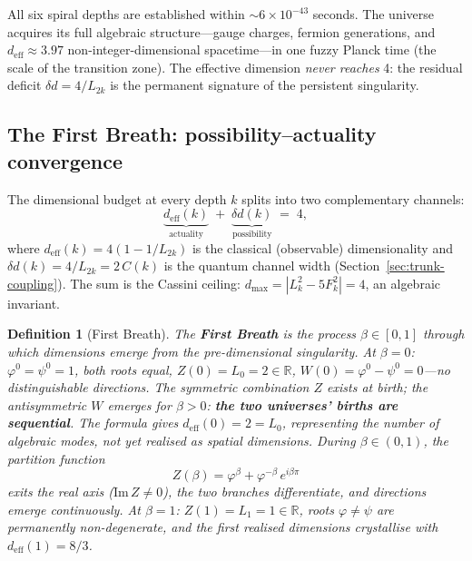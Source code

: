 \documentclass[12pt,a4paper]{article}
\newtheorem{definition}[theorem]{Definition}
\begin{document}
\noindent All six spiral depths are established within $\sim 6 \times 10^{-43}$ seconds. The universe acquires its full algebraic structure---gauge charges, fermion generations, and $d_{\mathrm{eff}} \approx 3.97$ non-integer-dimensional spacetime---in one fuzzy Planck time (the scale of the transition zone).  The effective dimension \emph{never reaches} 4: the residual deficit $\delta d = 4/L_{2k}$ is the permanent signature of the persistent singularity.

\subsection{The First Breath: possibility--actuality convergence}
\label{sec:first-breath}

The dimensional budget at every depth $k$ splits into two complementary channels:
\begin{equation}
\underbrace{d_{\mathrm{eff}}(k)}_{\text{actuality}} \;+\; \underbrace{\delta d(k)}_{\text{possibility}} \;=\; 4,
\label{eq:poss-act-budget}
\end{equation}
where $d_{\mathrm{eff}}(k) = 4(1 - 1/L_{2k})$ is the classical (observable) dimensionality and $\delta d(k) = 4/L_{2k} = 2\,C(k)$ is the quantum channel width (Section~\ref{sec:trunk-coupling}).  The sum is the Cassini ceiling: $d_{\max} = |L_k^2 - 5F_k^2| = 4$, an algebraic invariant.

\begin{definition}[First Breath]
\label{def:first-breath}
The \textbf{First Breath} is the process $\beta \in [0, 1]$ through which dimensions emerge from the pre-dimensional singularity.  At $\beta = 0$: $\varphi^0 = \psi^0 = 1$, both roots equal, $Z(0) = L_0 = 2 \in \mathbb{R}$, $W(0) = \varphi^0 - \psi^0 = 0$---no distinguishable directions.  The symmetric combination $Z$ exists at birth; the antisymmetric $W$ emerges for $\beta > 0$: \textbf{the two universes' births are sequential}.  The formula gives $d_{\mathrm{eff}}(0) = 2 = L_0$, representing the number of algebraic modes, not yet realised as spatial dimensions.  During $\beta \in (0,1)$, the partition function
\begin{equation}
Z(\beta) = \varphi^\beta + \varphi^{-\beta}\,e^{i\beta\pi}
\end{equation}
exits the real axis ($\mathrm{Im}\,Z \neq 0$), the two branches differentiate, and directions emerge continuously.  At $\beta = 1$: $Z(1) = L_1 = 1 \in \mathbb{R}$, roots $\varphi \neq \psi$ are permanently non-degenerate, and the first realised dimensions crystallise with $d_{\mathrm{eff}}(1) = 8/3$.
\end{definition}
\end{document}
